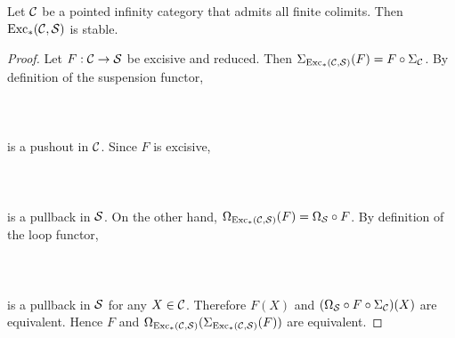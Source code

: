 \documentclass[a4paper]{article}
\begin{document}
\begin{prp}{}{} Let $\mathcal{C}$ be a pointed infinity category that admits all finite colimits. Then $\text{Exc}_\ast(\mathcal{C},\mathcal{S})$ is stable. \tcbline
\begin{proof}
Let $F:\mathcal{C}\to\mathcal{S}$ be excisive and reduced. Then $\Sigma_{\text{Exc}_\ast(\mathcal{C},\mathcal{S})}(F)=F\circ\Sigma_{\mathcal{C}}$. By definition of the suspension functor, \\~\\
\\~\\
is a pushout in $\mathcal{C}$. Since $F$ is excisive, \\~\\
\\~\\
is a pullback in $\mathcal{S}$. On the other hand, $\Omega_{\text{Exc}_\ast(\mathcal{C},\mathcal{S})}(F)=\Omega_{\mathcal{S}}\circ F$. By definition of the loop functor, \\~\\
\\~\\
is a pullback in $\mathcal{S}$ for any $X\in\mathcal{C}$. Therefore $F(X)$ and $(\Omega_{\mathcal{S}}\circ F\circ\Sigma_{\mathcal{C}})(X)$ are equivalent. Hence $F$ and $\Omega_{\text{Exc}_\ast(\mathcal{C},\mathcal{S})}(\Sigma_{\text{Exc}_\ast(\mathcal{C},\mathcal{S})}(F))$ are equivalent. 
\end{proof}
\end{prp}
\end{document}
